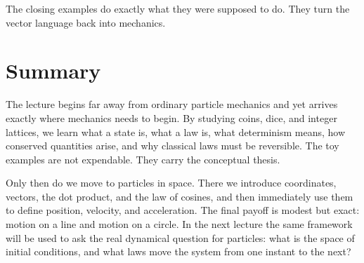 The closing examples do exactly what they were supposed to do. They turn the vector language back into mechanics.

\section{Summary}

The lecture begins far away from ordinary particle mechanics and yet arrives exactly where mechanics needs to begin. By studying coins, dice, and integer lattices, we learn what a state is, what a law is, what determinism means, how conserved quantities arise, and why classical laws must be reversible. The toy examples are not expendable. They carry the conceptual thesis.

Only then do we move to particles in space. There we introduce coordinates, vectors, the dot product, and the law of cosines, and then immediately use them to define position, velocity, and acceleration. The final payoff is modest but exact: motion on a line and motion on a circle. In the next lecture the same framework will be used to ask the real dynamical question for particles: what is the space of initial conditions, and what laws move the system from one instant to the next?